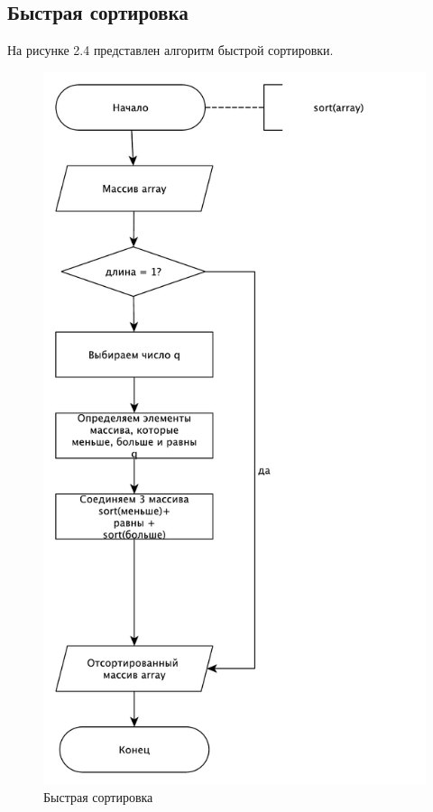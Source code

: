 \subsection{Быстрая сортировка}
На рисунке 2.4 представлен алгоритм быстрой сортировки.
\begin{figure}[H]
\centering
\includegraphics[scale=0.7]{./pictures/shema3.pdf}
\caption{Быстрая сортировка}
\end{figure}

